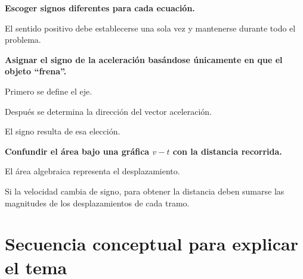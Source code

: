 \begin{errorfrecuente}
\textbf{Escoger signos diferentes para cada ecuación.}

El sentido positivo debe establecerse una sola vez y mantenerse durante todo
el problema.
\end{errorfrecuente}


\begin{errorfrecuente}
\textbf{Asignar el signo de la aceleración basándose únicamente en que el
objeto ``frena''.}

Primero se define el eje.

Después se determina la dirección del vector aceleración.

El signo resulta de esa elección.
\end{errorfrecuente}


\begin{errorfrecuente}
\textbf{Confundir el área bajo una gráfica \(v-t\) con la distancia
recorrida.}

El área algebraica representa el desplazamiento.

Si la velocidad cambia de signo, para obtener la distancia deben sumarse las
magnitudes de los desplazamientos de cada tramo.
\end{errorfrecuente}


\section{Secuencia conceptual para explicar el tema}

